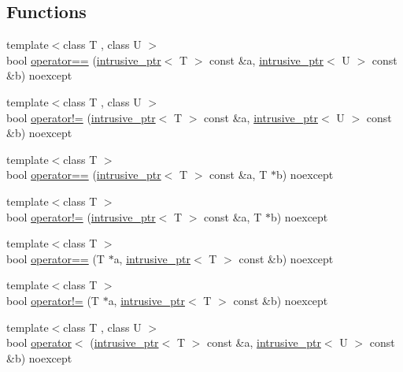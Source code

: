 \subsection*{Functions}
\begin{DoxyCompactItemize}
\item 
{\footnotesize template$<$class T , class U $>$ }\\bool \hyperlink{namespaceactor__zeta_ac598ab23cb84372ba91500b5d4747ee0}{operator==} (\hyperlink{classactor__zeta_1_1intrusive__ptr}{intrusive\+\_\+ptr}$<$ T $>$ const \&a, \hyperlink{classactor__zeta_1_1intrusive__ptr}{intrusive\+\_\+ptr}$<$ U $>$ const \&b) noexcept
\item 
{\footnotesize template$<$class T , class U $>$ }\\bool \hyperlink{namespaceactor__zeta_a0decf099760afba5650bca66df6d27fa}{operator!=} (\hyperlink{classactor__zeta_1_1intrusive__ptr}{intrusive\+\_\+ptr}$<$ T $>$ const \&a, \hyperlink{classactor__zeta_1_1intrusive__ptr}{intrusive\+\_\+ptr}$<$ U $>$ const \&b) noexcept
\item 
{\footnotesize template$<$class T $>$ }\\bool \hyperlink{namespaceactor__zeta_aab7f2c9b316e469055c2b954f2f19114}{operator==} (\hyperlink{classactor__zeta_1_1intrusive__ptr}{intrusive\+\_\+ptr}$<$ T $>$ const \&a, T $\ast$b) noexcept
\item 
{\footnotesize template$<$class T $>$ }\\bool \hyperlink{namespaceactor__zeta_a37a83c975b21ae711afbc79899f65ce5}{operator!=} (\hyperlink{classactor__zeta_1_1intrusive__ptr}{intrusive\+\_\+ptr}$<$ T $>$ const \&a, T $\ast$b) noexcept
\item 
{\footnotesize template$<$class T $>$ }\\bool \hyperlink{namespaceactor__zeta_a5af0f10ae3a42503cbb7abd442fd640e}{operator==} (T $\ast$a, \hyperlink{classactor__zeta_1_1intrusive__ptr}{intrusive\+\_\+ptr}$<$ T $>$ const \&b) noexcept
\item 
{\footnotesize template$<$class T $>$ }\\bool \hyperlink{namespaceactor__zeta_a77e38cafe133e9e6ddecab74c92ee0d7}{operator!=} (T $\ast$a, \hyperlink{classactor__zeta_1_1intrusive__ptr}{intrusive\+\_\+ptr}$<$ T $>$ const \&b) noexcept
\item 
{\footnotesize template$<$class T , class U $>$ }\\bool \hyperlink{namespaceactor__zeta_ad575198e737479f03575c22928499605}{operator$<$} (\hyperlink{classactor__zeta_1_1intrusive__ptr}{intrusive\+\_\+ptr}$<$ T $>$ const \&a, \hyperlink{classactor__zeta_1_1intrusive__ptr}{intrusive\+\_\+ptr}$<$ U $>$ const \&b) noexcept

\end{DoxyCompactItemize}
